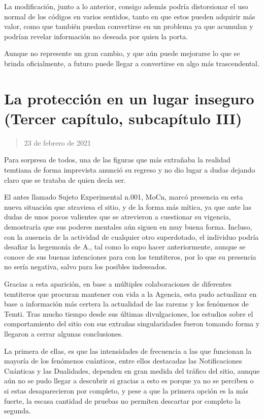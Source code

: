 \documentclass[
  spanish,
]{book}
\begin{document}
La modificación, junto a lo anterior, consigo además podría distorsionar el uso normal de los códigos en varios sentidos, tanto en que estos pueden adquirir más valor, como que también puedan convertirse en un problema ya que acumulan y podrían revelar información no deseada por quien la porta.

Aunque no represente un gran cambio, y que aún puede mejorarse lo que se brinda oficialmente, a futuro puede llegar a convertirse en algo más trascendental.

\hypertarget{la-protecciuxf3n-en-un-lugar-inseguro-tercer-capuxedtulo-subcapuxedtulo-iii}{%
\section{La protección en un lugar inseguro (Tercer capítulo, subcapítulo III)}\label{la-protecciuxf3n-en-un-lugar-inseguro-tercer-capuxedtulo-subcapuxedtulo-iii}}

\begin{quote}
23 de febrero de 2021
\end{quote}

Para sorpresa de todos, una de las figuras que más extrañaba la realidad temtiana de forma imprevista anunció su regreso y no dio lugar a dudas dejando claro que se trataba de quien decía ser.

El antes llamado Sujeto Experimental n.001, MoCn, marcó presencia en esta nueva situación que atraviesa el sitio, y de la forma más mítica, ya que ante las dudas de unos pocos valientes que se atrevieron a cuestionar su vigencia, demostraría que sus poderes mentales aún siguen en muy buena forma. Incluso, con la ausencia de la actividad de cualquier otro superdotado, el individuo podría desafiar la hegemonía de A., tal como lo supo hacer anteriormente, aunque se conoce de sus buenas intenciones para con los temtiteros, por lo que su presencia no sería negativa, salvo para los posibles indeseados.

Gracias a esta aparición, en base a múltiples colaboraciones de diferentes temtiteros que procuran mantener con vida a la Agencia, esta pudo actualizar en base a información más certera la actualidad de las rarezas y los fenómenos de Temti. Tras mucho tiempo desde sus últimas divulgaciones, los estudios sobre el comportamiento del sitio con sus extrañas singularidades fueron tomando forma y llegaron a cerrar algunas conclusiones.

La primera de ellas, es que las intensidades de frecuencia a las que funcionan la mayoría de los fenómenos cuánticos, entre ellos destacadas las Notificaciones Cuánticas y las Dualidades, dependen en gran medida del tráfico del sitio, aunque aún no se pudo llegar a descubrir si gracias a esto es porque ya no se perciben o si estas desaparecieron por completo, y pese a que la primera opción es la más fuerte, la escasa cantidad de pruebas no permiten descartar por completo la segunda.
\end{document}
